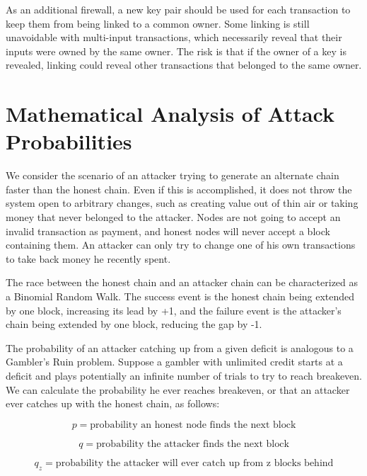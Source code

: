 \documentclass{article}
\begin{document}
As an additional firewall, a new key pair should be used for each transaction to keep them from being linked to a common owner. Some linking is still unavoidable with multi-input transactions, which necessarily reveal that their inputs were owned by the same owner. The risk is that if the owner of a key is revealed, linking could reveal other transactions that belonged to the same owner.

\section{Mathematical Analysis of Attack Probabilities}

We consider the scenario of an attacker trying to generate an alternate chain faster than the honest chain. Even if this is accomplished, it does not throw the system open to arbitrary changes, such as creating value out of thin air or taking money that never belonged to the attacker. Nodes are not going to accept an invalid transaction as payment, and honest nodes will never accept a block containing them. An attacker can only try to change one of his own transactions to take back money he recently spent.

The race between the honest chain and an attacker chain can be characterized as a Binomial Random Walk. The success event is the honest chain being extended by one block, increasing its lead by +1, and the failure event is the attacker's chain being extended by one block, reducing the gap by -1.

The probability of an attacker catching up from a given deficit is analogous to a Gambler's Ruin problem. Suppose a gambler with unlimited credit starts at a deficit and plays potentially an infinite number of trials to try to reach breakeven. We can calculate the probability he ever reaches breakeven, or that an attacker ever catches up with the honest chain, as follows:

\begin{equation}
p = \text{probability an honest node finds the next block}
\end{equation}

\begin{equation}
q = \text{probability the attacker finds the next block}
\end{equation}

\begin{equation}
q_z = \text{probability the attacker will ever catch up from z blocks behind}
\end{equation}
\end{document}

